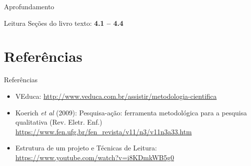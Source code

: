 \documentclass{beamer}
\begin{document}
\begin{frame}{Aprofundamento}
  \begin{block}{Leitura}
    Seções do livro texto: {\bf 4.1 -- 4.4}
  \end{block}
\end{frame}

\section{Referências}

\begin{frame}{Referências}
  \begin{itemize}
  \item<1-> VEduca:
    \url{http://www.veduca.com.br/assistir/metodologia-cientifica}
  \item<1-> Koerich {\em et al} (2009): Pesquisa-ação: ferramenta
    metodológica para a pesquisa qualitativa (Rev. Eletr. Enf.)
    \url{https://www.fen.ufg.br/fen_revista/v11/n3/v11n3a33.htm}
  \item<1-> Estrutura de um projeto e Técnicas de Leitura:
    \url{https://www.youtube.com/watch?v=i8KDmkWB5g0}
  \end{itemize}
\end{frame}
\end{document}

